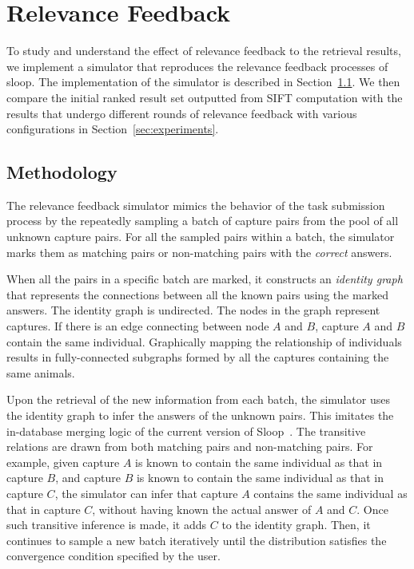\graphicspath{{./images/chap4/}}
\chapter{Relevance Feedback}
\label{chap:relevance_feedback}

To study and understand the effect of relevance feedback to the retrieval
results, we implement a simulator that reproduces the relevance feedback
processes of sloop. The implementation of the simulator is described in
Section~\ref{sec:method}. We then compare the initial ranked result set
outputted from SIFT computation with the results that undergo different rounds
of relevance feedback with various configurations in
Section~\ref{sec:experiments}.

\section{Methodology}
\label{sec:method}

The relevance feedback simulator mimics the behavior of the task submission
process by the repeatedly sampling a batch of capture pairs from the pool of
all unknown capture pairs. For all the sampled pairs within a batch, the
simulator marks them as matching pairs or non-matching pairs with the
\emph{correct} answers.

When all the pairs in a specific batch are marked, it constructs an
\emph{identity graph} that represents the connections between all the known
pairs using the marked answers. The identity graph is undirected. The nodes in
the graph represent captures. If there is an edge connecting between node $A$
and $B$, capture $A$ and $B$ contain the same individual. Graphically mapping
the relationship of individuals results in fully-connected subgraphs formed by
all the captures containing the same animals.

Upon the retrieval of the new information from each batch, the simulator uses
the identity graph to infer the answers of the unknown pairs. This imitates the
in-database merging logic of the current version of Sloop~\cite{sloopdocs}. The
transitive relations are drawn from both matching pairs and non-matching pairs.
For example, given capture $A$ is known to contain the same individual as that
in capture $B$, and capture $B$ is known to contain the same individual as that
in capture $C$, the simulator can infer that capture $A$ contains the same
individual as that in capture $C$, without having known the actual answer of
$A$ and $C$. Once such transitive inference is made, it adds $C$ to the
identity graph. Then, it continues to sample a new batch iteratively until the
distribution satisfies the convergence condition specified by the user.

